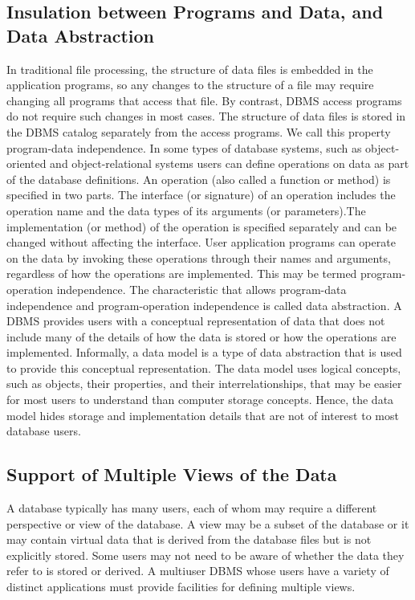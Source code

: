 \subsection{Insulation between Programs and Data, and Data Abstraction}
In traditional file processing, the structure of data files is embedded in the application programs, so any changes to the structure of a file may require changing all programs that access that file. By contrast, DBMS access programs do not require such changes in most cases. The structure of data files is stored in the DBMS catalog separately from the access programs. We call this property program-data independence. In some types of database systems, such as object-oriented and object-relational systems users can define operations on data as part of the database definitions. An operation (also called a function or method) is specified in two parts. The interface (or signature) of an operation includes the operation name and the data types of its arguments (or parameters).The implementation (or method) of the operation is specified separately and can be changed without affecting the interface. User application programs can operate on the data by invoking these operations through their names and arguments, regardless of how the operations are implemented. This may be termed program-operation independence. The characteristic that allows program-data independence and program-operation independence is called data abstraction. A DBMS provides users with a conceptual representation of data that does not include many of the details of how the data is stored or how the operations are implemented. Informally, a data model is a type of data abstraction that is used to provide this conceptual representation. The data model uses logical concepts, such as objects, their properties, and their interrelationships, that may be easier for most users to understand than computer storage concepts. Hence, the data model hides storage and implementation details that are not of interest to most database users.

\subsection{Support of Multiple Views of the Data}
A database typically has many users, each of whom may require a different perspective or view of the database. A view may be a subset of the database or it may contain virtual data that is derived from the database files but is not explicitly stored. Some users may not need to be aware of whether the data they refer to is stored or derived. A multiuser DBMS whose users have a variety of distinct applications must provide facilities for defining multiple views.

